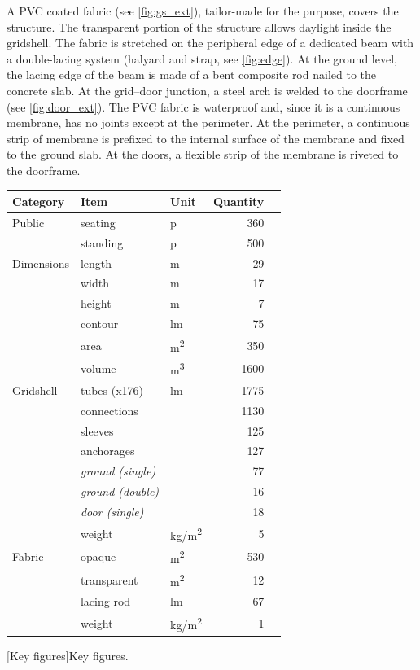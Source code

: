 A PVC coated fabric (see \cref{fig:gs_ext}), tailor-made for the purpose, covers the structure. The transparent portion of the structure allows daylight inside the gridshell. The fabric is stretched on the peripheral edge of a dedicated beam with a double-lacing system (halyard and strap, see \cref{fig:edge}). At the ground level, the lacing edge of the beam is made of a bent composite rod nailed to the concrete slab. At the grid–door junction, a steel arch is welded to the doorframe (see \cref{fig:door_ext}). The PVC fabric is waterproof and, since it is a continuous membrane, has no joints except at the perimeter. At the perimeter, a continuous strip of membrane is prefixed to the internal surface of the membrane and fixed to the ground slab. At the doors, a flexible strip of the membrane is riveted to the doorframe.
\vspace{0.4cm}
\begin{table}[h]
\centering
{}
 	\begin{tabular}{@{}lllrr@{}}
	\toprule
 	Category	 	& Item 						& Unit 		& Quantity\\ 
	\midrule
	Public  		& seating  					& p					& 360 \\
      				& standing 					& p					& 500 \\
	\midrule
	Dimensions   	&  length						& m 					& 29	\\
	   			&  width 						& m					& 17	\\   			
				&  height 						& m					& 7	\\
				& contour 	 					& lm					& 75\\
				& area						& m\textsuperscript{2}	& 350\\
				&  volume						& m\textsuperscript{3}	& 1600 \\
	\midrule
	Gridshell   	&  tubes (x176)					& lm					& 1775 \\
	   			&  connections					& 					& 1130 \\   			
				&  sleeves						& 					& 125 \\
				& anchorages 					& 					& 127 \\
				& \quad \emph{ground (single)} 	& 					& 77 \\
				& \quad \emph{ground (double)} 	& 					& 16 \\
				& \quad \emph{door (single)} 		& 					& 18 \\
				& weight  						& kg/m\textsuperscript{2} 	& 5 \\
	\midrule
	Fabric   		& opaque						& m\textsuperscript{2}	 & 530 \\
	   			& transparent					& m\textsuperscript{2}	& 12 \\ 
				& lacing rod					& lm 				 	& 67 \\  			
				& weight						& kg/m\textsuperscript{2}	& 1 \\
	\bottomrule
 	\end{tabular}
[Key figures]{Key figures.}
\end{table}

